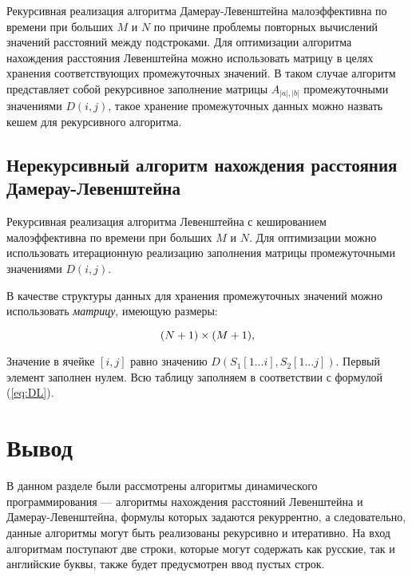 Рекурсивная реализация алгоритма Дамерау-Левенштейна малоэффективна по времени при больших $M$ и $N$ по причине проблемы повторных вычислений значений расстояний между подстроками. Для оптимизации алгоритма нахождения расстояния Левенштейна можно использовать матрицу в целях хранения соответствующих промежуточных значений. В таком случае алгоритм представляет собой рекурсивное заполнение матрицы $A_{|a|,|b|}$ промежуточными значениями $D(i,j)$, такое хранение промежуточных данных можно назвать кешем для рекурсивного алгоритма.

\subsection{Нерекурсивный алгоритм нахождения расстояния Дамерау-Левенштейна}

Рекурсивная реализация алгоритма Левенштейна с кешированием малоэффективна по времени при больших $M$ и $N$. Для оптимизации можно использовать итерационную реализацию заполнения матрицы промежуточными значениями $D(i,j)$.

В качестве структуры данных для хранения промежуточных значений можно использовать \textit{матрицу}, имеющую  размеры:

\begin{equation}
	(N + 1)\\\times(M + 1),
\end{equation}

Значение в ячейке $[i, j]$ равно значению $D(S_{1}[1...i], S_{2}[1...j])$. Первый элемент заполнен нулем. Всю таблицу заполняем в соответствии с формулой (\ref{eq:DL}).

\section*{Вывод}

В данном разделе были рассмотрены алгоритмы динамического программирования --- алгоритмы нахождения расстояний Левенштейна и Дамерау-Левенштейна, формулы которых задаются рекуррентно, а следовательно, данные алгоритмы могут быть реализованы рекурсивно и итеративно. На вход алгоритмам поступают две строки, которые могут содержать как русские, так и английские буквы, также будет предусмотрен ввод пустых строк.
